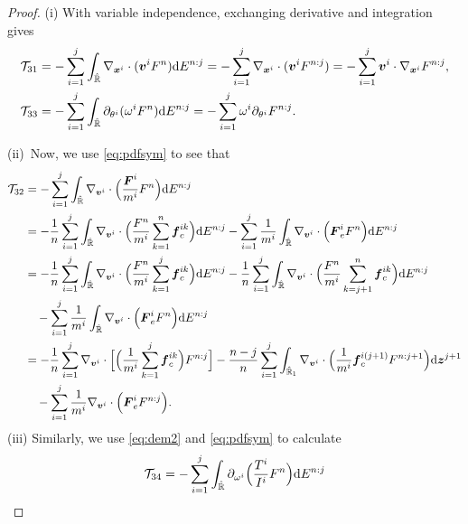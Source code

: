 \documentclass[a4paper,11pt]{article}
\numberwithin{equation}{section}
\theoremstyle{definition}
\newcommand{\bfx}{\boldsymbol{x}}
\newcommand{\bfz}{\boldsymbol{z}}
\newcommand{\bfv}{\boldsymbol{v}}
\newcommand{\bff}{\boldsymbol{f}}
\newcommand{\bfF}{\boldsymbol{F}}
\newcommand{\bbr}{\mathbb R}
\def\d{{  \rm d}}
\newcommand{\T}{\mathcal{T}}
\begin{document}
\begin{proof}
\noindent (i) With variable independence, exchanging derivative and integration gives 
\begin{align*}
\begin{aligned}
\T_{31} & =  -\sum_{i=1}^j  \int_{\hat{\bbr}}  \nabla_{\bfx^i} \cdot  (\bfv^i F^n) \d E^{n:j} =  -\sum_{i=1}^j  \nabla_{\bfx^i} \cdot (\bfv^i F^{n:j}) = -  \sum_{i=1}^j  \bfv^i  \cdot \nabla_{\bfx^i} F^{n:j}, \\
\T_{33} & =  -\sum_{i=1}^j  \int_{\hat{\bbr}}  \partial_{\theta^i} (\omega^iF^n)  \d E^{n:j} =  -\sum_{i=1}^j  \omega^i \partial_{\theta^i} F^{n:j}. 
\end{aligned}
\end{align*}

%
%
\noindent
(ii)~Now, we use \eqref{eq:pdfsym} to see that 
\begin{align*}
\begin{aligned} %
\T_{32} &= - \sum_{i=1}^{j} \int_{\hat{\bbr}} \nabla_{\bfv^i} \cdot \Big ( \frac{\bfF^i}{m^i} F^n \Big ) \d E^{n:j} \\
     & = -\frac{1}{n} \sum_{i=1}^{j}  \int_{\hat{\bbr}} \nabla_{\bfv^i} \cdot \Big( \frac{F^n }{m^i}  \sum_{k=1}^{n} \bff_c^{ik} \Big) \d E^{n:j} - \sum_{i=1}^{j}  \frac{1}{m^i} \int_{\hat{\bbr}} \nabla_{\bfv^i} \cdot \Big( \bfF^i_e F^n \Big) \d E^{n:j} \\
   & = - \frac{1}{n} \sum_{i=1}^{j}  \int_{\hat{\bbr}} \nabla_{\bfv^i} \cdot \Big( \frac{F^n }{m^i}  \sum_{k=1}^{j} \bff_c^{ik} \Big) \d E^{n:j} -\frac{1}{n} \sum_{i=1}^{j}  \int_{\hat{\bbr}} \nabla_{\bfv^i} \cdot \Big( \frac{F^n }{m^i}  \sum_{k=j+1}^{n} \bff_c^{ik} \Big) \d E^{n:j}  \\
   & \quad - \sum_{i=1}^{j}  \frac{1}{m^i} \int_{\hat{\bbr}} \nabla_{\bfv^i} \cdot \Big( \bfF^i_e F^n \Big) \d E^{n:j} \\
& =  -\frac{1}{n} \sum_{i=1}^{j}  \nabla_{\bfv^i} \cdot  \Big[ \Big( \frac{1}{m^i}  \sum_{k=1}^{j} \bff_c^{ik} \Big)  F^{n:j} \Big] 
 -\frac{n-j}{n} \sum_{i=1}^{j}  \int_{\hat{\bbr}_1} \nabla_{\bfv^i} \cdot \Big( \frac{1}{m^i} \bff_c^{i(j+1)} F^{n:j+1} \Big)\d\bfz^{j+1} \\
& \quad  - \sum_{i=1}^{j} \frac{1}{m^i}  \nabla_{\bfv^i} \cdot \Big( \bfF^i_e F^{n:j} \Big).
\end{aligned}
\end{align*}
(iii) Similarly, we use \eqref{eq:dem2} and \eqref{eq:pdfsym} to calculate
\begin{align*}
\T_{34} &= - \sum_{i=1}^{j} \int_{\hat{\bbr}}  \partial_{\omega^i} \Big( \frac{T^i}{I^i} F^n \Big)   \d E^{n:j} \\

\end{align*}
\end{proof}
\end{document}
